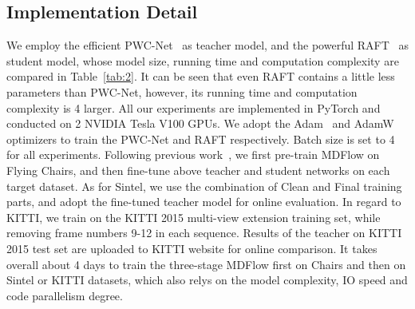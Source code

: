 \documentclass[lettersize,journal]{IEEEtran}
\begin{document}
\subsection{Implementation Detail} \label{Implementation Detail}
We employ the efficient PWC-Net~\cite{8579029} as teacher model, and the powerful RAFT~\cite{teed2020raft} as student model, whose model size, running time and computation complexity are compared in Table~\ref{tab:2}. It can be seen that even RAFT contains a little less parameters than PWC-Net, however, its running time and computation complexity is 4 larger. All our experiments are implemented in PyTorch and conducted on 2 NVIDIA Tesla V100 GPUs. We adopt the Adam~\cite{kingma2014method} and AdamW~\cite{loshchilov2018decoupled} optimizers to train the PWC-Net and RAFT respectively. Batch size is set to 4 for all experiments. Following previous work~\cite{Liu:2019:DDFlow,10.1007/978-3-030-58586-0_11,10.1007/978-3-030-58536-5_33}, we first pre-train MDFlow on Flying Chairs, and then fine-tune above teacher and student networks on each target dataset. As for Sintel, we use the combination of Clean and Final training parts, and adopt the fine-tuned teacher model for online evaluation. In regard to KITTI, we train on the KITTI 2015 multi-view extension training set, while removing frame numbers 9-12 in each sequence. Results of the teacher on KITTI 2015 test set are uploaded to KITTI website for online comparison. It takes overall about 4 days to train the three-stage MDFlow first on Chairs and then on Sintel or KITTI datasets, which also relys on the model complexity, IO speed and code parallelism degree.
\end{document}
